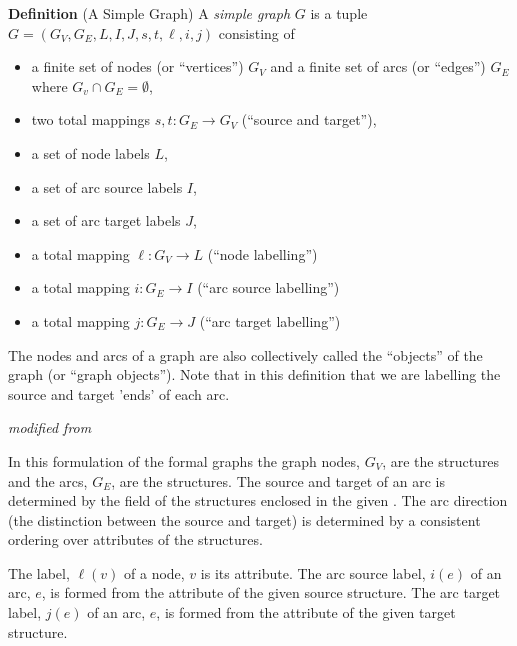 \documentclass{cekarticle}
\begin{document}
\textbf{Definition} (A Simple Graph) A \emph{simple graph} $G$ is a
tuple $G = (G_{V}, G_{E}, L, I, J, s, t, \ell, i, j)$
consisting of
\begin{itemize}

\item a finite set of nodes (or ``vertices'') $G_{V}$ and a finite set of arcs (or ``edges'') $G_{E}$
        where $G_{v} \cap G_{E} = \emptyset$,

\item two total mappings $s, t : G_{E} \rightarrow G_{V}$ (``source and target''),

\item a set of node labels $L$,

\item a set of arc source labels $I$,

\item a set of arc target labels $J$,

\item a total mapping $\ell : G_{V} \rightarrow L$ (``node labelling'')

\item a total mapping $i : G_{E} \rightarrow I$ (``arc source labelling'')

\item a total mapping $j : G_{E} \rightarrow J$ (``arc target labelling'')

\end{itemize}
The nodes and arcs of a graph are also collectively called the ``objects'' of the graph
(or ``graph objects'').  Note that in this definition that we are labelling the source and 
target 'ends' of each arc.

\emph{ modified from \citep{rudolf:1998}}

In this formulation of the formal graphs
the graph nodes, $G_{V}$, are the  structures and
the arcs, $G_{E}$, are the 
structures.  The source and target of an arc is determined by the  field
of the  structures enclosed in the given .
The arc direction (the distinction between the source and target) is determined by a consistent ordering
over  attributes of the  structures.  

The label, $\ell(v)$ of a node, $v$ is its
 attribute.  The arc source label, $i(e)$ of an arc, $e$, is formed from the
 attribute of the given source  structure.
The arc target label, $j(e)$ of an arc, $e$, is formed from the
 attribute of the given target  structure.
\end{document}
